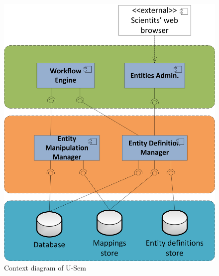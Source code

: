 \documentclass[a4paper, notitlepage]{article}
\begin{document}
\begin{figure}[h!]
  \centering
  	\includegraphics[scale=0.6]{functional/func_main.png}
  \caption{Context diagram of U-Sem }
  \label{fig_context}
\end{figure}
\end{document}
